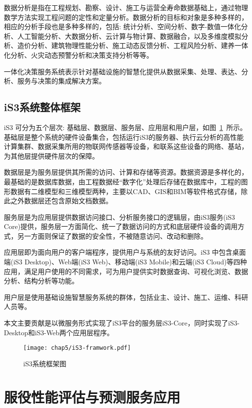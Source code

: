 数据分析是指在工程规划、勘察、设计、施工与运营全寿命数据基础上，通过物理数学方法实现工程问题的定性和定量分析。数据分析的目标和对象是多种多样的，相应的分析手段也是多种多样的，包括: 统计分析、空间分析、数字-数值一体化分析、人工智能分析、大数据分析、云计算与物计算、数据融合，以及多维度模拟分析、造价分析、建筑物理性能分析、施工动态反馈分析、工程风险分析、建养一体化分析、火灾动态预警分析和决策支持分析等等。

一体化决策服务系统表示针对基础设施的智慧化提供从数据采集、处理、表达、分析、服务与决策的集成解决方案。

\subsection{iS3系统整体框架}

iS3 可分为五个层次: 基础层、数据层、服务层、应用层和用户层，如图~\ref{fig:iS3系统框架图2}~所示。基础层是整个系统的硬件设备集合，包括运行iS3的服务器、执行云分析的高性能计算集群、数据采集所用的物联网传感器等设备，和联系这些设备的网络、基站，为其他层提供硬件层次的保障。

数据层是为服务层提供其所需的访问、计算和存储等资源。数据资源是多样化的，最基础的是数据库数据，由工程数据经“数字化”处理后存储在数据库中，工程的图形数据有二维模型和三维模型两种，主要以CAD、GIS和BIM等软件格式存储，除此之外数据层还包含原始文档数据。

服务层是为应用层提供数据访问接口、分析服务接口的逻辑层，由iS3服务(iS3 Core)提供，服务层一方面简化、统一了数据访问的方式和底层硬件设备的调用方式，另一方面则保证了数据的安全性，不被随意访问、改动和删除。

应用层即为面向用户的客户端程序，提供用户与系统的友好访问。iS3 中包含桌面端(iS3 Desktop)、Web端(iS3 Web)、移动端(iS3 Mobile)和云端(iS3 Cloud)等四种应用，满足用户使用的不同需求，可为用户提供实时数据查询、可视化浏览、数据分析、结构分析等功能。

用户层是使用基础设施智慧服务系统的群体，包括业主、设计、施工、运维、科研人员等。

本文主要贡献是以微服务形式实现了iS3平台的服务层iS3-Core，同时实现了iS3-Desktop和iS3-Web两个应用层程序。

\begin{figure}[htb!]
    \centering
    \texttt{[image: chap5/iS3-framwork.pdf]}
    \caption{iS3系统框架图}
    \label{fig:iS3系统框架图2}
\end{figure}

\section{服役性能评估与预测服务应用}

